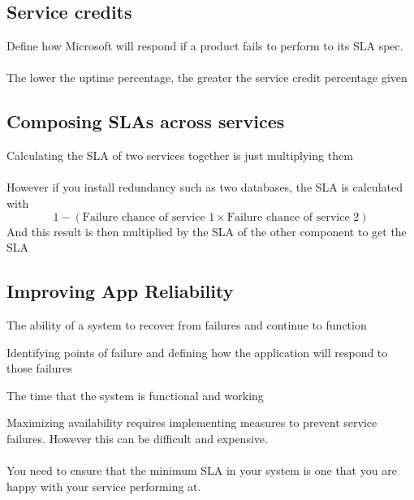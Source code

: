 \documentclass{article}[18pt]
\begin{document}
\subsection{Service credits}
Define how Microsoft will respond if a product fails to perform to its SLA spec.\\
\\
The lower the uptime percentage, the greater the service credit percentage given
\subsection{Composing SLAs across services}
Calculating the SLA of two services together is just multiplying them\\
\\
However if you install redundancy such as two databases, the SLA is calculated with
$$1-(\text{Failure chance of service 1} \times \text{Failure chance of service 2})$$
And this result is then multiplied by the SLA of the other component to get the SLA
\subsection{Improving App Reliability}
\begin{definition}[Resiliency]
	The ability of a system to recover from failures and continue to function
\end{definition}
\begin{definition}
	Identifying points of failure and defining how the application will respond to those failures
\end{definition}
\begin{definition}[Availability]
	The time that the system is functional and working
\end{definition}
Maximizing availability requires implementing measures to prevent service failures. However this can be difficult and expensive.\\
\\
You need to ensure that the minimum SLA in your system is one that you are happy with your service performing at.
\end{document}
